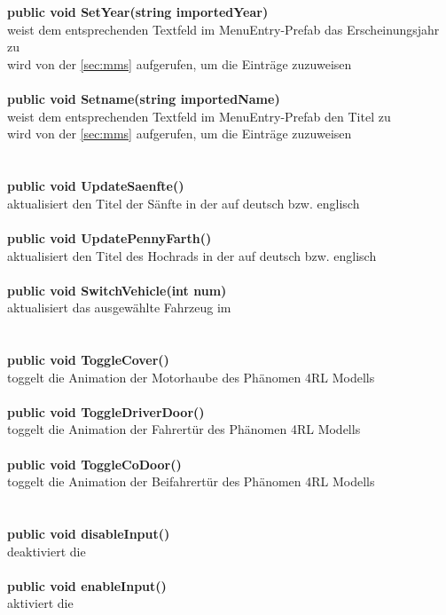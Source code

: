 \section{\mec}
%
\textbf{public void SetYear(string importedYear)}\\
weist dem entsprechenden Textfeld im MenuEntry-Prefab das Erscheinungsjahr zu\\
wird von der \mms{} \ref{sec:mms} aufgerufen, um die Einträge zuzuweisen\\
\\
\textbf{public void Setname(string importedName)}\\
weist dem entsprechenden Textfeld im MenuEntry-Prefab den Titel zu\\
wird von der \mms{} \ref{sec:mms} aufgerufen, um die Einträge zuzuweisen\\
%
\section{\msc}
%
\textbf{public void UpdateSaenfte()}\\
aktualisiert den Titel der Sänfte in der \mms{} auf deutsch bzw. englisch\\
\\
\textbf{public void UpdatePennyFarth()}\\
aktualisiert den Titel des Hochrads in der \mms{} auf deutsch bzw. englisch\\
\\
\textbf{public void SwitchVehicle(int num)}\\
aktualisiert das ausgewählte Fahrzeug im \ssc\\
%
\section{\orc}
%
\textbf{public void ToggleCover()}\\
toggelt die Animation der Motorhaube des Phänomen 4RL Modells\\
\\
\textbf{public void ToggleDriverDoor()}\\
toggelt die Animation der Fahrertür des Phänomen 4RL Modells\\
\\
\textbf{public void ToggleCoDoor()}\\
toggelt die Animation der Beifahrertür des Phänomen 4RL Modells\\
%
\section{\ars}
%
\textbf{public void disableInput()}\\
deaktiviert die \ars\\
\\
\textbf{public void enableInput()}\\
aktiviert die \ars\\
%
